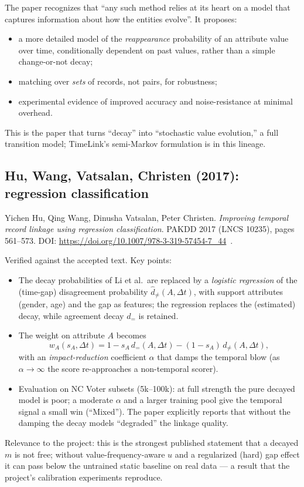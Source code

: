 \documentclass[11pt]{article}
\newcommand{\dt}{\Delta t}
\begin{document}
The paper recognizes that ``any such method relies at its heart on a model that captures
information about how the entities evolve''. It proposes:
\begin{itemize}[leftmargin=*]
  \item a more detailed model of the \emph{reappearance} probability of an attribute value
        over time, conditionally dependent on past values, rather than a simple
        change-or-not decay;
  \item matching over \emph{sets} of records, not pairs, for robustness;
  \item experimental evidence of improved accuracy and noise-resistance at minimal
        overhead.
\end{itemize}
This is the paper that turns ``decay'' into ``stochastic value evolution,'' a full
transition model; TimeLink's semi-Markov formulation is in this lineage.

\subsection{Hu, Wang, Vatsalan, Christen (2017): regression classification}

Yichen Hu, Qing Wang, Dinusha Vatsalan, Peter Christen.
\emph{Improving temporal record linkage using regression classification}.
PAKDD 2017 (LNCS 10235), pages 561--573.
DOI: \url{https://doi.org/10.1007/978-3-319-57454-7\_44}~\cite{hu2017}.

Verified against the accepted text. Key points:
\begin{itemize}[leftmargin=*]
  \item The decay probabilities of Li et al.\ are replaced by a \emph{logistic
        regression} of the (time-gap) disagreement probability $\hat d_{\neq}(A,\dt)$,
        with support attributes (gender, age) and the gap as features; the regression
        replaces the (estimated) decay, while agreement decay $d_=$ is retained.
  \item The weight on attribute $A$ becomes
        \begin{equation}
          w_A(s_A,\dt) = 1 - s_A\,d_=(A,\dt) - (1-s_A)\, d_{\neq}(A,\dt),
          \label{eq:hu}
        \end{equation}
        with an \emph{impact-reduction} coefficient $\alpha$ that damps the temporal
        blow (as $\alpha\to\infty$ the score re-approaches a non-temporal scorer).
  \item Evaluation on NC Voter subsets (5k--100k): at full strength the pure decayed
        model is poor; a moderate $\alpha$ and a larger training pool give the temporal
        signal a small win (``Mixed''). The paper explicitly reports that without the
        damping the decay models ``degraded'' the linkage quality.
\end{itemize}
Relevance to the project: this is the strongest published statement that a decayed $m$ is not
free; without value-frequency-aware $u$ and a regularized (hard) gap effect it can pass
below the untrained static baseline on real data --- a result that the project's
calibration experiments reproduce.
\end{document}
